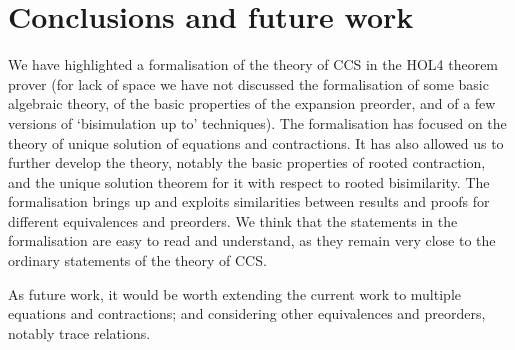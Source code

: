 


\section{Conclusions and future work}
\label{s:concl}

We have highlighted a formalisation of the theory of CCS in the 
HOL4 theorem prover (for lack of space we have not discussed 
the formalisation of some basic algebraic theory, of the basic
properties of the expansion preorder,   and of a few
 versions of `bisimulation up to'
techniques). %
The formalisation has focused on the theory of
unique solution of equations and contractions. 
It has also allowed us to further develop the theory,
notably the basic properties of rooted contraction, and the unique
solution theorem for it with respect to rooted bisimilarity. 
The formalisation brings up and exploits similarities between results
and proofs for different equivalences and preorders. 
We think that the statements in the formalisation are easy to read and
understand, as they remain very close  to  the ordinary  statements of
the theory of CCS. 


As future work,  it would be worth extending the current work
to multiple equations and contractions; and considering other equivalences
and preorders, notably trace relations.  



